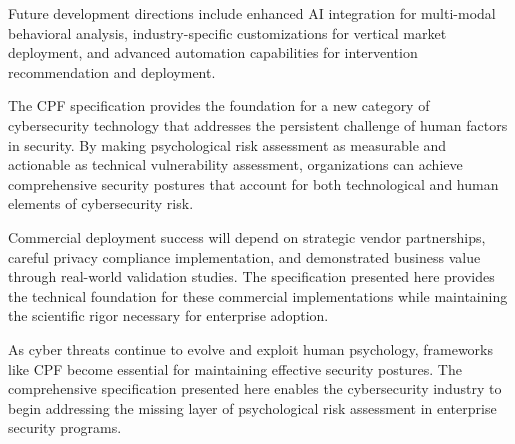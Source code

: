\documentclass[10pt,twocolumn]{IEEEtran}
\begin{document}
Future development directions include enhanced AI integration for multi-modal behavioral analysis, industry-specific customizations for vertical market deployment, and advanced automation capabilities for intervention recommendation and deployment.

The CPF specification provides the foundation for a new category of cybersecurity technology that addresses the persistent challenge of human factors in security. By making psychological risk assessment as measurable and actionable as technical vulnerability assessment, organizations can achieve comprehensive security postures that account for both technological and human elements of cybersecurity risk.

Commercial deployment success will depend on strategic vendor partnerships, careful privacy compliance implementation, and demonstrated business value through real-world validation studies. The specification presented here provides the technical foundation for these commercial implementations while maintaining the scientific rigor necessary for enterprise adoption.

As cyber threats continue to evolve and exploit human psychology, frameworks like CPF become essential for maintaining effective security postures. The comprehensive specification presented here enables the cybersecurity industry to begin addressing the missing layer of psychological risk assessment in enterprise security programs.


\end{document}
